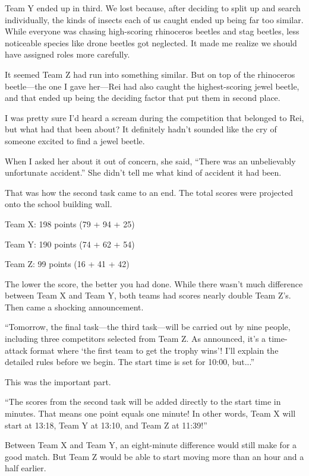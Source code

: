 \documentclass[
    a4paper,
    12pt,
    twoside,
    openany,
    UTF8,
    fontset=windows
]{ctexbook}
\begin{document}
Team Y ended up in third. We lost because, after deciding to split up and search individually, the kinds of insects each of us caught ended up being far too similar. While everyone was chasing high-scoring rhinoceros beetles and stag beetles, less noticeable species like drone beetles got neglected. It made me realize we should have assigned roles more carefully.

It seemed Team Z had run into something similar. But on top of the rhinoceros beetle---the one I gave her---Rei had also caught the highest-scoring jewel beetle, and that ended up being the deciding factor that put them in second place.

I was pretty sure I'd heard a scream during the competition that belonged to Rei, but what had that been about? It definitely hadn't sounded like the cry of someone excited to find a jewel beetle.

When I asked her about it out of concern, she said, ``There was an unbelievably unfortunate accident.'' She didn't tell me what kind of accident it had been.

That was how the second task came to an end. The total scores were projected onto the school building wall.

\begin{center}
Team X: 198 points (79 + 94 + 25)

Team Y: 190 points (74 + 62 + 54)

Team Z: 99 points (16 + 41 + 42)
\end{center}

The lower the score, the better you had done. While there wasn't much difference between Team X and Team Y, both teams had scores nearly double Team Z's. Then came a shocking announcement.

``Tomorrow, the final task---the third task---will be carried out by nine people, including three competitors selected from Team Z. As announced, it's a time-attack format where `the first team to get the trophy wins'! I'll explain the detailed rules before we begin. The start time is set for 10:00, but...''

This was the important part.

``The scores from the second task will be added directly to the start time in minutes. That means one point equals one minute! In other words, Team X will start at 13:18, Team Y at 13:10, and Team Z at 11:39!''

Between Team X and Team Y, an eight-minute difference would still make for a good match. But Team Z would be able to start moving more than an hour and a half earlier.
\end{document}
